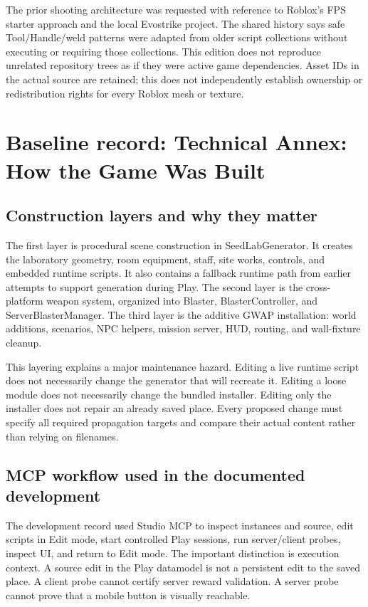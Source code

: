 The prior shooting architecture was requested with reference to Roblox's FPS starter approach and the local Evostrike project.\allowbreak{} The shared history says safe Tool/\allowbreak{}Handle/\allowbreak{}weld patterns were adapted from older script collections without executing or requiring those collections.\allowbreak{} This edition does not reproduce unrelated repository trees as if they were active game dependencies.\allowbreak{} Asset IDs in the actual source are retained; this does not independently establish ownership or redistribution rights for every Roblox mesh or texture.\allowbreak{}

\chapter{Baseline record: Technical Annex: How the Game Was Built}
\section{Construction layers and why they matter}
The first layer is procedural scene construction in SeedLabGenerator.\allowbreak{} It creates the laboratory geometry, room equipment, staff, site works, controls, and embedded runtime scripts.\allowbreak{} It also contains a fallback runtime path from earlier attempts to support generation during Play.\allowbreak{} The second layer is the cross-platform weapon system, organized into Blaster, BlasterController, and ServerBlasterManager.\allowbreak{} The third layer is the additive GWAP installation: world additions, scenarios, NPC helpers, mission server, HUD, routing, and wall-fixture cleanup.\allowbreak{}

This layering explains a major maintenance hazard.\allowbreak{} Editing a live runtime script does not necessarily change the generator that will recreate it.\allowbreak{} Editing a loose module does not necessarily change the bundled installer.\allowbreak{} Editing only the installer does not repair an already saved place.\allowbreak{} Every proposed change must specify all required propagation targets and compare their actual content rather than relying on filenames.\allowbreak{}

\section{MCP workflow used in the documented development}
The development record used Studio MCP to inspect instances and source, edit scripts in Edit mode, start controlled Play sessions, run server/\allowbreak{}client probes, inspect UI, and return to Edit mode.\allowbreak{} The important distinction is execution context.\allowbreak{} A source edit in the Play datamodel is not a persistent edit to the saved place.\allowbreak{} A client probe cannot certify server reward validation.\allowbreak{} A server probe cannot prove that a mobile button is visually reachable.\allowbreak{}

